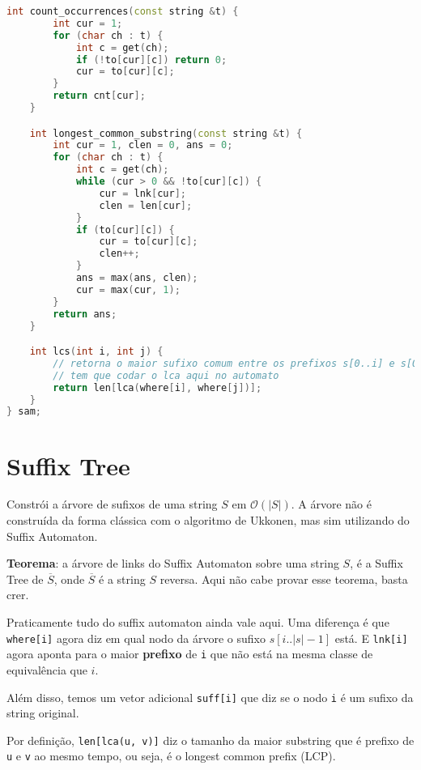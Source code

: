 \documentclass[10pt, a4paper, oneside]{book}
\begin{document}
\begin{lstlisting}[language=C++]
    int count_occurrences(const string &t) {
        int cur = 1;
        for (char ch : t) {
            int c = get(ch);
            if (!to[cur][c]) return 0;
            cur = to[cur][c];
        }
        return cnt[cur];
    }

    int longest_common_substring(const string &t) {
        int cur = 1, clen = 0, ans = 0;
        for (char ch : t) {
            int c = get(ch);
            while (cur > 0 && !to[cur][c]) {
                cur = lnk[cur];
                clen = len[cur];
            }
            if (to[cur][c]) {
                cur = to[cur][c];
                clen++;
            }
            ans = max(ans, clen);
            cur = max(cur, 1);
        }
        return ans;
    }

    int lcs(int i, int j) {
        // retorna o maior sufixo comum entre os prefixos s[0..i] e s[0..j]
        // tem que codar o lca aqui no automato
        return len[lca(where[i], where[j])];
    }
} sam;
\end{lstlisting}
\hfill

\section{Suffix Tree}


Constrói a árvore de sufixos de uma string $S$ em $\mathcal{O}(|S|)$. A árvore não é construída da forma clássica com o algoritmo de Ukkonen, mas sim utilizando do Suffix Automaton.



\textbf{Teorema}: a árvore de links do Suffix Automaton sobre uma string $S$, é a Suffix Tree de $\overline{S}$, onde $\overline{S}$ é a string $S$ reversa. Aqui não cabe provar esse teorema, basta crer.



Praticamente tudo do suffix automaton ainda vale aqui. Uma diferença é que \texttt{where[i]} agora diz em qual nodo da árvore o sufixo $s[i..|s|-1]$ está. E \texttt{lnk[i]} agora aponta para o maior \textbf{prefixo} de \texttt{i} que não está na mesma classe de equivalência que $i$.



Além disso, temos um vetor adicional \texttt{suff[i]} que diz se o nodo \texttt{i} é um sufixo da string original.



Por definição, \texttt{len[lca(u, v)]} diz o tamanho da maior substring que é prefixo de \texttt{u} e \texttt{v} ao mesmo tempo, ou seja, é o longest common prefix (LCP).
\end{document}
